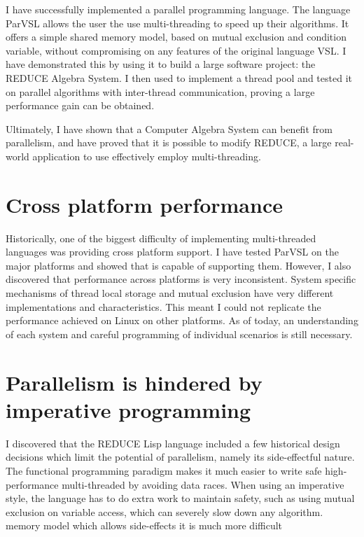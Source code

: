 I have successfully implemented a parallel programming language. The language ParVSL
allows the user the use multi-threading to speed up their algorithms. It offers
a simple shared memory model, based on mutual exclusion and condition variable,
without compromising on any features of the original language VSL. I have demonstrated
this by using it to build a large software project: the REDUCE Algebra System.
I then used to implement a thread pool and tested it on parallel algorithms with
inter-thread communication, proving a large performance gain can be obtained.

Ultimately, I have shown that a Computer Algebra System can benefit from parallelism,
and have proved that it is possible to modify REDUCE, a large real-world application
to use effectively employ multi-threading.

\section{Cross platform performance}

Historically, one of the biggest difficulty of implementing multi-threaded languages
was providing cross platform support. I have tested ParVSL on the major platforms and
showed that is capable of supporting them. However, I also discovered that performance
across platforms is very inconsistent. System specific mechanisms of thread local storage
and mutual exclusion have very different implementations and characteristics. This meant
I could not replicate the performance achieved on Linux on other platforms. As of today,
an understanding of each system and careful programming of individual scenarios is still
necessary.

\section{Parallelism is hindered by imperative programming}

I discovered that the REDUCE Lisp language included a few historical design decisions which
limit the potential of parallelism, namely its side-effectful nature. The functional programming
paradigm makes it much easier to write safe high-performance multi-threaded by avoiding
data races. When using an imperative style, the language has to do extra work to maintain safety,
such as using mutual exclusion on variable access, which can severely slow down any algorithm.
memory model which allows side-effects it is much more difficult

